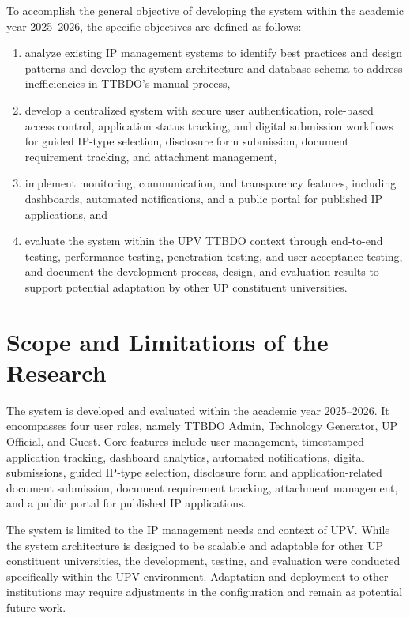 To accomplish the general objective of developing the system within the academic year 2025--2026, the specific objectives are defined as follows:

\begin{enumerate}
  \item analyze existing IP management systems to identify best practices and design patterns and develop the system architecture and database schema to address inefficiencies in TTBDO’s manual process, 
  \item develop a centralized system with secure user authentication, role-based access control, application status tracking, and digital submission workflows for guided IP-type selection, disclosure form submission, document requirement tracking, and attachment management,
  \item implement monitoring, communication, and transparency features, including dashboards, automated notifications, and a public portal for published IP applications, and
  \item evaluate the system within the UPV TTBDO context through end-to-end testing, performance testing, penetration testing, and user acceptance testing, and document the development process, design, and evaluation results to support potential adaptation by other UP constituent universities.
\end{enumerate}

\section{Scope and Limitations of the Research}

The system is developed and evaluated within the academic year 2025--2026. It encompasses four user roles, namely TTBDO Admin, Technology Generator, UP Official, and Guest. Core features include user management, timestamped application tracking, dashboard analytics, automated notifications, digital submissions, guided IP-type selection, disclosure form and application-related document submission, document requirement tracking, attachment management, and a public portal for published IP applications.

The system is limited to the IP management needs and context of UPV. While the system architecture is designed to be scalable and adaptable for other UP constituent universities, the development, testing, and evaluation were conducted specifically within the UPV environment. Adaptation and deployment to other institutions may require adjustments in the configuration and remain as potential future work.

